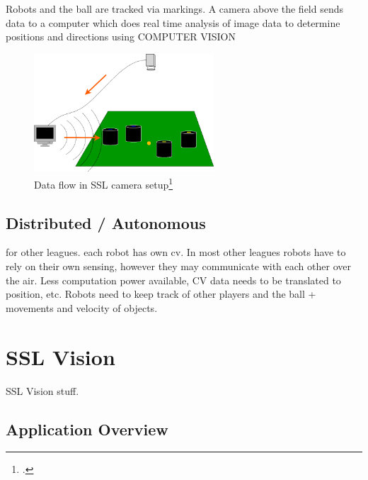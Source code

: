 Robots and the ball are tracked via markings. A camera above the field sends
data to a computer which does real time analysis of image data to determine
positions and directions using COMPUTER VISION

\begin{savenotes}
\begin{figure}[htbp]
\begin{center}
  \includegraphics[width=0.6\textwidth]{img/ssl_dataflow.png}
  \caption[Data flow in SSL camera setup]{Data flow in SSL camera setup\footcite[][]{robo_ssl_wiki}}
  \label{fig:ssl_dataflow}
\end{center}
\end{figure}
\end{savenotes}

\subsection{Distributed / Autonomous}
for other leagues. each robot has own cv.
In most other leagues robots have to rely on their own sensing, however they may
communicate with each other over the air.
Less computation power available, CV data needs to be translated to position,
etc. Robots need to keep track of other players and the ball + movements and
velocity of objects.



\newpage
\section{SSL Vision \label{sec:ssl-vision}}
SSL Vision stuff.

\subsection{Application Overview \label{sec:ssl-overview}}



